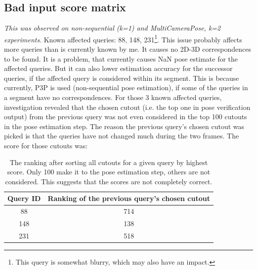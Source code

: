 \documentclass[twoside]{ctuthesis}
\theoremstyle{plain}
\theoremstyle{definition}
\theoremstyle{note}
\newcommand{\topRetrieval}{100} %
\begin{document}
\subsection{Bad input score matrix}
\emph{This was observed on non-sequential (k=1) and MultiCameraPose, k=2 experiments}. Known affected queries: 88, 148, 231\footnote{This query is somewhat blurry, which may also have an impact.}. This issue probably affects more queries than is currently known by me. It causes no 2D-3D correspondences to be found. It is a problem, that currently causes NaN pose estimate for the affected queries. But it can also lower estimation accuracy for the successor queries, if the affected query is considered within its segment. This is because currently, P3P is used (non-sequential pose estimation), if some of the queries in a segment have no correspondences. For those 3 known affected queries, investigation revealed that the chosen cutout (i.e. the top one in pose verification output) from the previous query was not even considered in the top \topRetrieval{} cutouts in the pose estimation step. The reason the previous query's chosen cutout was picked is that the queries have not changed much during the two frames. The score for those cutouts was:

\begin{table}[htb!]
	\centering
	\begin{tabular}{|c|c|}
		\hline
		Query ID & Ranking of the previous query's chosen cutout \\
		\hline
		88 & 714 \\
		\hline
		148 & 138 \\
		\hline
		231 & 518 \\
		\hline
	\end{tabular}
	\caption{The ranking after sorting all cutouts for a given query by highest score. Only \topRetrieval{} make it to the pose estimation step, others are not considered. This suggests that the scores are not completely correct.}
	\label{tab:bad-scores-wrong-candidates}
\end{table}
\end{document}
